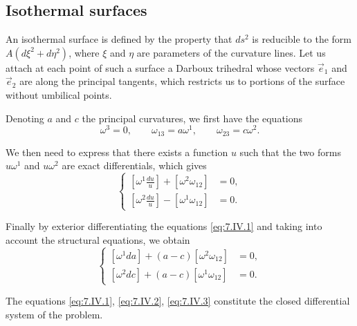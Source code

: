 \documentclass[leqno,11pt]{book}
\numberwithin{equation}{chapter}
\theoremstyle{shape1}
\theoremstyle{shape0}
\theoremstyle{shape2}
\theoremstyle{definition}
\begin{document}
\subsection{Isothermal surfaces}
\label{sec:isothermal-surfaces}

\fsec An isothermal surface is defined by the property that $ds^{2}$ is reducible to the form $A(d\xi^{2}+d\eta^{2})$, where $\xi$ and $\eta$ are parameters of the curvature lines. Let us attach at each point of such a surface a Darboux trihedral whose vectors $\vec e_{1}$ and $\vec e_{2}$ are along the principal tangents, which restricts us to portions of the surface without umbilical points.

Denoting $a$ and $c$ the principal curvatures, we first have the equations
\begin{equation}
  \label{eq:7.IV.1}\tag{IV, 1}
  \omega^{3}=0,\qquad \omega_{13}=a\omega^{1},\qquad \omega_{23}=c\omega^{2}.
\end{equation}

We then need to express that there exists a function $u$ such that the two forms $u\omega^{1}$ and $u\omega^{2}$ are exact differentials, which gives
\begin{equation}
  \label{eq:7.IV.2}\tag{IV, 2}
  \left\{
    \begin{aligned}
      \left[\omega^{1}\frac{du}{u}\right]+[\omega^{2}\omega_{12}]&=0,\\
      \left[\omega^{2}\frac{du}{u}\right]-[\omega^{1}\omega_{12}]&=0.
    \end{aligned}
  \right.
\end{equation}

Finally by exterior differentiating the equations \eqref{eq:7.IV.1} and taking into account the structural equations, we obtain
\begin{equation}
  \label{eq:7.IV.3}\tag{IV, 3}
  \left\{
    \begin{aligned}{}
      [\omega^{1}da]+(a-c)[\omega^{2}\omega_{12}]&=0,\\
      [\omega^{2}dc]+(a-c)[\omega^{1}\omega_{12}]&=0.
    \end{aligned}
  \right.
\end{equation}

The equations \eqref{eq:7.IV.1}, \eqref{eq:7.IV.2}, \eqref{eq:7.IV.3} constitute the closed differential system of the problem.
\end{document}
